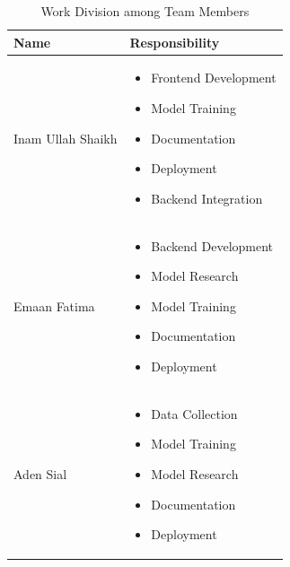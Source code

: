 \begin{table}[!h]
\centering
\begin{tabular}{|l|p{10cm}|}
\hline
\textbf{Name} & \textbf{Responsibility} \\ \hline

Inam Ullah Shaikh & 
\begin{itemize}
    \item Frontend Development
    \item Model Training
    \item Documentation
    \item Deployment
    \item Backend Integration
\end{itemize} \\ \hline

Emaan Fatima & 
\begin{itemize}
    \item Backend Development
    \item Model Research
    \item Model Training
    \item Documentation
    \item Deployment
\end{itemize} \\ \hline

Aden Sial & 
\begin{itemize}
    \item Data Collection
    \item Model Training
    \item Model Research
    \item Documentation
    \item Deployment
\end{itemize} \\ \hline

\end{tabular}
\caption{Work Division among Team Members}
\end{table}
\let\cleardoublepage\clearpage
